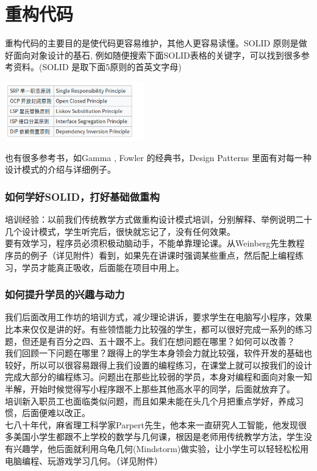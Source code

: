 \chapter{重构代码} %

重构代码的主要目的是使代码更容易维护，其他人更容易读懂。SOLID
原则是做好面向对象设计的基石,
例如随便搜索下面SOLID表格的关键字，可以找到很多参考资料。(SOLID
是取下面5原则的首英文字母)


\includegraphics[width=6cm]{Screenshotfrom2022-12-2822-14-39.png}

也有很多参考书，如Gamma , Fowler 的经典书，Design Patterns
里面有对每一种设计模式的介绍与详细例子。

\hypertarget{ux5982ux4f55ux5b66ux597dsolidux6253ux597dux57faux7840ux505aux91cdux6784}{%
\subsection{如何学好SOLID，打好基础做重构}\label{ux5982ux4f55ux5b66ux597dsolidux6253ux597dux57faux7840ux505aux91cdux6784}}

培训经验：以前我们传统教学方式做重构设计模式培训，分别解释、举例说明二十几个设计模式，学生听完后，很快就忘记了，没有任何效果。\\
要有效学习，程序员必须积极动脑动手，不能单靠理论课。从Weinberg先生教程序员的例子（详见附件）看到，如果先在讲课时强调某些重点，然后配上编程练习，学员才能真正吸收，后面能在项目中用上。

\hypertarget{ux5982ux4f55ux63d0ux5347ux5b66ux5458ux7684ux5174ux8da3ux4e0eux52a8ux529b}{%
\subsection{如何提升学员的兴趣与动力}\label{ux5982ux4f55ux63d0ux5347ux5b66ux5458ux7684ux5174ux8da3ux4e0eux52a8ux529b}}

我们后面改用工作坊的培训方式，减少理论讲诉，要求学生在电脑写小程序，效果比本来仅仅是讲的好。有些领悟能力比较强的学生，都可以很好完成一系列的练习题，但还是有百分之四、五十跟不上。我们在想问题在哪里？如何可以改善？\\
我们回顾一下问题在哪里？跟得上的学生本身领会力就比较强，软件开发的基础也较好，所以可以很容易跟得上我们设置的编程练习，在课堂上就可以按我们的设计完成大部分的编程练习。问题出在那些比较弱的学员，本身对编程和面向对象一知半解，开始时候觉得写小程序跟不上那些其他高水平的同学，后面就放弃了。\\
培训新入职员工也面临类似问题，而且如果未能在头几个月把重点学好，养成习惯，后面便难以改正。\\
七八十年代，麻省理工科学家Parpert先生，他本来一直研究人工智能，他发现很多美国小学生都跟不上学校的数学与几何课，根因是老师用传统教学方法，学生没有兴趣学，他后面就利用乌龟几何(Mindstorm)做实验，让小学生可以轻轻松松用电脑编程、玩游戏学习几何。（详见附件）

